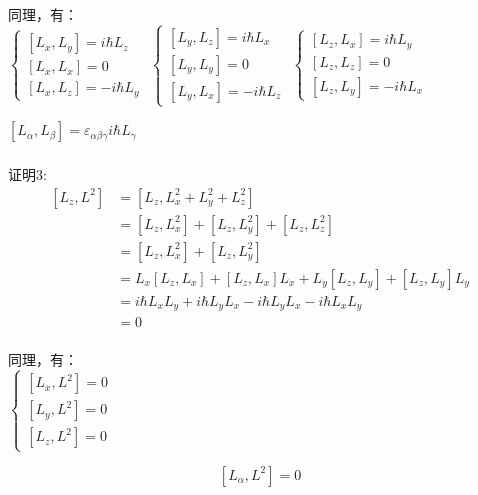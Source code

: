 \begin{frame} 
    同理，有：\\
    $\begin{cases}
        [L_x,L_y]= i\hbar L_z  \\ 
        [L_x,L_x]= 0  \\ 
        [L_x,L_z]= -i\hbar L_y 
    \end{cases}$
    $\begin{cases}
        [L_y,L_z]= i\hbar L_x  \\ 
        [L_y,L_y]= 0  \\ 
        [L_y,L_x]= -i\hbar L_z 
    \end{cases}$
    $\begin{cases}
        [L_z,L_x]= i\hbar L_y  \\ 
        [L_z,L_z]= 0  \\ 
        [L_z,L_y]= -i\hbar L_x 
    \end{cases}$
    \begin{tcolorbox4}[角动量对易关系1]
        $ [L_\alpha,L_\beta]= \varepsilon_{\alpha\beta\gamma} i\hbar L_\gamma $ 
    \end{tcolorbox4}
\end{frame} 

\begin{frame}
    \frametitle{}
    \alert{证明3:} 
    \begin{equation*}
        \begin{split}
        [L_z,L^2]&= [L_z,L_x ^2+L_y ^2+L_z ^2]\\
        &=[L_z,L_x ^2]+[L_z,L_y ^2]+[L_z,L_z ^2]\\
        &=[L_z,L_x ^2]+[L_z,L_y ^2]\\
        &=L_x[L_z,L_x] +[L_z,L_x]L_x +L_y[L_z,L_y] +[L_z,L_y]L_y\\
        &=i\hbar L_x L_y +i\hbar L_yL_x -i\hbar L_yL_x- i\hbar L_xL_y \\
        &=0 \\
        \end{split}  
    \end{equation*}
\end{frame} 

\begin{frame}     
    同理，有：\\
    $\begin{cases}
        [L_x,L^2]= 0  \\ 
        [L_y,L^2]= 0  \\ 
        [L_z,L^2]= 0 
    \end{cases}$
    \begin{tcolorbox4}[角动量对易关系2]
        $$ [L_\alpha,L^2]= 0 $$ 
    \end{tcolorbox4}
\end{frame} 

